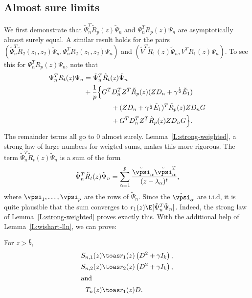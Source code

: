 \subsection{Almost sure limits}

We first demonstrate that $\tilde \Psi_n^T \tilde R_p(z) \tilde \Psi_n$ and 
$\Psi_n^T R_p (z) \Psi_n$ are asymptotically almost surely
equal. A similar result holds for the pairs 
$(\tilde \Psi_n^T \tilde R_2(z_1, z_2) \tilde \Psi_n,
  \Psi_n^T R_2(z_1, z_2) \Psi_n)$
and $(\tilde V^T \tilde R_1(z) \tilde \Psi_n, V^T R_1(z) \Psi_n)$.
To see this for $\Psi_n^T R_p(z) \Psi_n$, note that
\begin{align*}
    \begin{split}
    \Psi_n^T R_t (z) \Psi_n
    &=
    \tilde \Psi_n^T \tilde R_t(z) \tilde \Psi_n \\
        &+ \frac{1}{p} \Big\{
        G^T D_n^T Z^T \tilde R_p(z) ( Z D_n + \gamma^{\frac{1}{2}} \tilde E_1) \\
        &\qquad \qquad +
        ( Z D_n + \gamma^{\frac{1}{2}} \tilde E_1)^T \tilde R_p(z) Z D_n G \\
        &\qquad \qquad +
        G^T D_n^T Z^T \tilde R_p(z) Z D_n G
        \Big\}.
    \end{split}
\end{align*}
The remainder terms all go to $0$ almost surely.
Lemma~\ref{L:strong-weighted}, a strong law of large numbers for weigted sums,
makes this more rigorous.  The term 
$\tilde \Psi_n^T \tilde R_t(z) \tilde \Psi_n$ is a sum of the form
\[
    \tilde \Psi_n^T \tilde R_t(z) \tilde \Psi_n 
    =
    \sum_{\alpha=1}^p
        \frac{\tilde \vpsi_\alpha \tilde \vpsi^T_\alpha }
             {(z - \lambda_\alpha)^t},
\]
where $\tilde \vpsi_1, \ldots, \tilde \vpsi_p$ are the rows of $\tilde \Psi_n$.
Since the $\tilde \vpsi_\alpha$ are i.i.d, it is quite plausible that the sum
converges to $r_1(z) \E[ \tilde \Psi_n^T \tilde \Psi_n ]$.  Indeed, the strong
law of Lemma~\ref{L:strong-weighted} proves exactly this.  With the additional
help of Lemma~\ref{L:wishart-lln}, we can prove:

\begin{lemma}\label{L:Sbar}
    For $z > \bar b$, 
    \begin{align*}
        S_{n,1}(z) &\toas r_1(z) \left( D^2 + \gamma I_k \right), \\
        S_{n,2}(z) &\toas r_2(z) \left( D^2 + \gamma I_k \right), \\
    \intertext{and}
        T_n(z) &\toas r_1(z) D.
    \end{align*}
\end{lemma}

